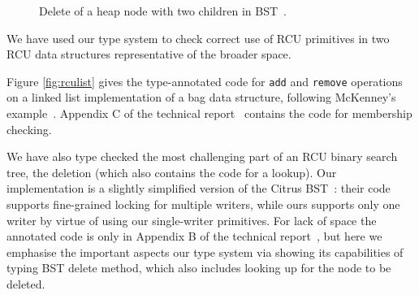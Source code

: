 \begin{figure}[!t]
\begin{subfigure}[b]{.4\linewidth}
\label{fig:del2.6}
\end{subfigure}
\caption{\textsf{Delete} of a heap node with two children in BST~\cite{Arbel:2014:CUR:2611462.2611471}.}
\label{fig:del2}
\end{figure}
We have used our type system to check correct use of RCU primitives in two RCU data structures representative of the broader space.

Figure \ref{fig:rculist} gives the type-annotated code for \lstinline|add| and \lstinline|remove| operations on a linked list implementation of a bag data structure, following McKenney's example~\cite{McKenney2015SomeEO}.
Appendix C of the technical report~\cite{isotek} contains the code for membership checking.

We have also type checked the most challenging part of an RCU binary search tree, the deletion (which also contains the code for a lookup).
Our implementation is a slightly simplified version of the Citrus BST~\cite{Arbel:2014:CUR:2611462.2611471}: their code supports fine-grained locking for multiple writers, while ours supports only one writer by virtue of using our single-writer primitives. For lack of space the annotated code is only in Appendix B of the technical report~\cite{isotek}, but here we emphasise the important aspects our type system via showing its capabilities of typing BST delete method, which also includes looking up for the node to be deleted.%

